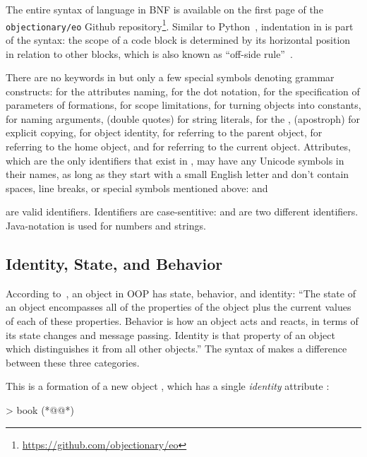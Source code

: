 The entire syntax of \eolang{} language in BNF is available on the first page of the
\texttt{objectionary/eo} Github repository\footnote{\url{https://github.com/objectionary/eo}}.
Similar to Python~\citep{lutz2013learning}, indentation in \eolang{} is part of the syntax:
the scope of a code block is determined by its horizontal position
in relation to other blocks, which is also known as ``off-side rule''~\citep{landin1966next}.

There are no keywords in \eolang{} but only a few special symbols
denoting grammar constructs:
  \ff{>} for the attributes naming,
   for the dot notation,
  \ff{[]} for the specification of parameters of formations,
  \ff{()} for scope limitations,
  \ff{!} for turning objects into constants,
  \ff{:} for naming arguments,
   (double quotes) for string literals,
   for the ,
   (apostroph) for explicit copying,
  \ff{<} for object identity,
  \ff{\^{}} for referring to the parent object,
  \ff{\&{}} for referring to the home object,
  and
  \ff{\$} for referring to the current object.
Attributes, which are the only identifiers that exist in \eolang{}, may have
any Unicode symbols in their names, as long as they start with a small English letter
and don't contain spaces, line breaks, or special symbols mentioned above:
 and
\begin{CJK}{UTF8}{gbsn}
\end{CJK}
 are valid identifiers.
Identifiers are case-sentitive:  and  are two different identifiers.
Java-notation is used for numbers and strings.

\subsection{Identity, State, and Behavior}

According to~\citet{grady2007object}, an object in OOP has state, behavior, and identity:
``The state of an object encompasses all of the properties of
the object plus the current values of each of these properties.
Behavior is how an object acts and reacts, in terms of its state changes and message passing.
Identity is that property of an object which distinguishes it from all other objects.''
The syntax of \eolang{} makes a difference between these three categories.

This is a formation of a new object ,
which has a single \emph{identity} attribute :

\begin{ffcode}
[isbn] > book (*@\label{ln:book}@*)
\end{ffcode}

